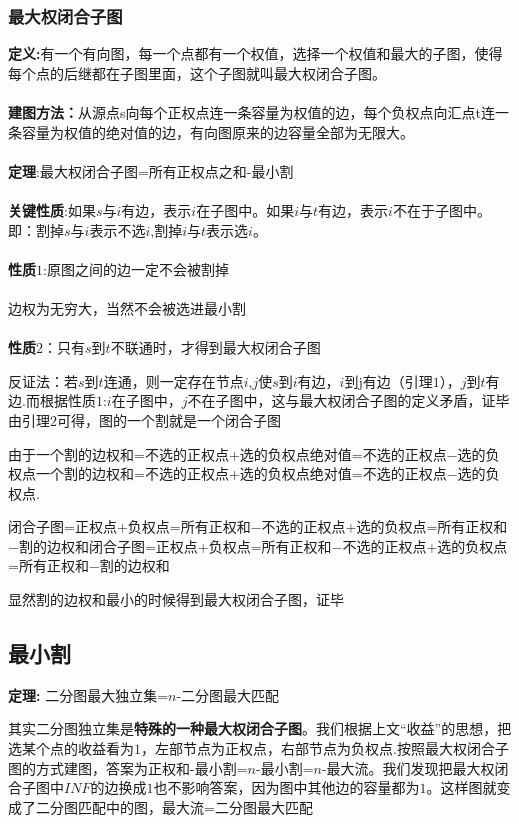 \documentclass[12pt, a4paper, oneside]{ctexart}
\begin{document}
\subsubsection{最大权闭合子图}
\textbf{定义:}有一个有向图，每一个点都有一个权值，选择一个权值和最大的子图，使得每个点的后继都在子图里面，这个子图就叫最大权闭合子图。\\\\
\textbf{建图方法：}从源点s向每个正权点连一条容量为权值的边，每个负权点向汇点t连一条容量为权值的绝对值的边，有向图原来的边容量全部为无限大。\\\\
\textbf{定理}:最大权闭合子图=所有正权点之和-最小割\\\\
\textbf{关键性质}:如果$s$与$i$有边，表示$i$在子图中。如果$i$与$t$有边，表示$i$不在于子图中。即：割掉$s$与$i$表示不选$i$,割掉$i$与$t$表示选$i$。\\\\
\textbf{性质$1$}:原图之间的边一定不会被割掉\\\\
 边权为无穷大，当然不会被选进最小割\\\\
\textbf{性质$2$}：只有$s$到$t$不联通时，才得到最大权闭合子图\par
 反证法：若$s$到$t$连通，则一定存在节点$i$,$j$使$s$到$i$有边，$i$到j有边（引理$1$），$j$到$t$有边.而根据性质$1$:$i$在子图中，$j$不在子图中，这与最大权闭合子图的定义矛盾，证毕
由引理$2$可得，图的一个割就是一个闭合子图\par
由于一个割的边权和=不选的正权点+选的负权点绝对值=不选的正权点−选的负权点一个割的边权和=不选的正权点+选的负权点绝对值=不选的正权点−选的负权点.\par
闭合子图=正权点+负权点=所有正权和−不选的正权点+选的负权点=所有正权和−割的边权和闭合子图=正权点+负权点=所有正权和−不选的正权点+选的负权点=所有正权和−割的边权和\par
显然割的边权和最小的时候得到最大权闭合子图，证毕


\subsection{最小割}
\textbf{定理:} 二分图最大独立集=$n$-二分图最大匹配\par
其实二分图独立集是\textbf{特殊的一种最大权闭合子图}。我们根据上文“收益”的思想，把选某个点的收益看为$1$，左部节点为正权点，右部节点为负权点.按照最大权闭合子图的方式建图，答案为正权和-最小割=$n$-最小割=$n$-最大流。我们发现把最大权闭合子图中$INF$的边换成$1$也不影响答案，因为图中其他边的容量都为$1$。这样图就变成了二分图匹配中的图，最大流=二分图最大匹配
\end{document}
